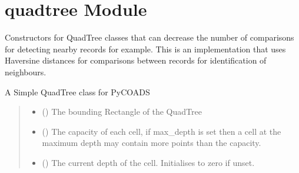 \documentclass[letterpaper,10pt,english]{sphinxmanual}
\begin{document}
\section{quadtree Module}
\label{\detokenize{quadtree:module-geotrees.quadtree}}\label{\detokenize{quadtree:quadtree-module}}
\sphinxAtStartPar
Constructors for QuadTree classes that can decrease the number of comparisons
for detecting nearby records for example. This is an implementation that uses
Haversine distances for comparisons between records for identification of
neighbours.

\begin{fulllineitems}
\label{\detokenize{quadtree:geotrees.quadtree.QuadTree}}
\pysigstartsignatures
\pysiglinewithargsret
{}
{\sphinxparamcomma {}\sphinxparamcomma {}\sphinxparamcomma {}}
{}
\pysigstopsignatures
\sphinxAtStartPar
A Simple QuadTree class for PyCOADS
\begin{quote}\begin{description}
\begin{itemize}
\item {}
\sphinxAtStartPar
{} ({\hyperref[\detokenize{shape:geotrees.shape.Rectangle}]{}}) \textendash{} The bounding Rectangle of the QuadTree

\item {}
\sphinxAtStartPar
{} () \textendash{} The capacity of each cell, if max\_depth is set then a cell at the
maximum depth may contain more points than the capacity.

\item {}
\sphinxAtStartPar
{} () \textendash{} The current depth of the cell. Initialises to zero if unset.


\end{itemize}
\end{description}
\end{quote}
\end{fulllineitems}
\end{document}
